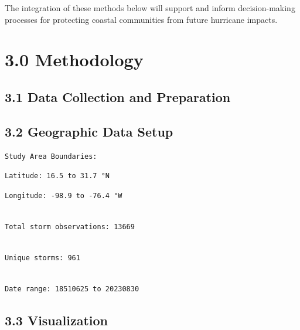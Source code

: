 \documentclass[12pt,letterpaper]{article}
\begin{document}
The integration of these methods below will support and inform
decision-making processes for protecting coastal communities from future
hurricane impacts.

\section{3.0 Methodology}\label{methodology}

\subsection{3.1 Data Collection and
Preparation}\label{data-collection-and-preparation}

\subsection{3.2 Geographic Data Setup}\label{geographic-data-setup}

\begin{verbatim}
Study Area Boundaries:
\end{verbatim}

\begin{verbatim}
Latitude: 16.5 to 31.7 °N
\end{verbatim}

\begin{verbatim}
Longitude: -98.9 to -76.4 °W
\end{verbatim}

\begin{verbatim}

Total storm observations: 13669
\end{verbatim}

\begin{verbatim}

Unique storms: 961
\end{verbatim}

\begin{verbatim}

Date range: 18510625 to 20230830
\end{verbatim}

\subsection{3.3 Visualization}\label{visualization}
\end{document}
